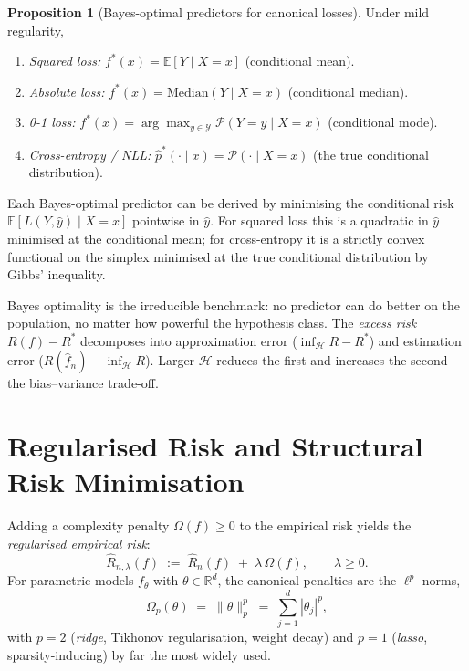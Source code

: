 \documentclass[11pt]{article}
\theoremstyle{definition}
\newtheorem{proposition}[definition]{Proposition}
\begin{document}
\begin{proposition}[Bayes-optimal predictors for canonical losses]
Under mild regularity,
\begin{enumerate}[label=(\roman*), leftmargin=2em]
  \item \emph{Squared loss:}
        $f^{\ast}(x) = \mathbb{E}[Y \mid X = x]$ (conditional mean).
  \item \emph{Absolute loss:}
        $f^{\ast}(x) = \mathrm{Median}(Y \mid X = x)$ (conditional median).
  \item \emph{0-1 loss:}
        $f^{\ast}(x) = \arg\max_{y \in \mathcal{Y}}
                       \mathcal{P}(Y = y \mid X = x)$ (conditional mode).
  \item \emph{Cross-entropy / NLL:}
        $\hat p^{\ast}(\cdot \mid x) = \mathcal{P}(\cdot \mid X = x)$
        (the true conditional distribution).
\end{enumerate}
\end{proposition}

\begin{mathnote}
Each Bayes-optimal predictor can be derived by minimising the conditional
risk $\mathbb{E}[L(Y, \hat y) \mid X = x]$ pointwise in $\hat y$. For
squared loss this is a quadratic in $\hat y$ minimised at the conditional
mean; for cross-entropy it is a strictly convex functional on the simplex
minimised at the true conditional distribution by Gibbs' inequality.
\end{mathnote}

\begin{mlnote}
Bayes optimality is the irreducible benchmark: no predictor can do better
on the population, no matter how powerful the hypothesis class. The
\emph{excess risk} $R(f) - R^{\ast}$ decomposes into approximation error
($\inf_{\mathcal{H}} R - R^{\ast}$) and estimation error
($R(\widehat{f}_n) - \inf_{\mathcal{H}} R$). Larger $\mathcal{H}$ reduces
the first and increases the second -- the bias--variance trade-off.
\end{mlnote}

\section{Regularised Risk and Structural Risk Minimisation}

Adding a complexity penalty $\Omega(f) \geq 0$ to the empirical risk yields
the \emph{regularised empirical risk}:
\[
  \widehat{R}_{n, \lambda}(f) \;:=\; \widehat{R}_n(f) \;+\; \lambda\, \Omega(f),
  \qquad \lambda \geq 0.
\]
For parametric models $f_\theta$ with $\theta \in \mathbb{R}^{d}$, the
canonical penalties are the $\ell^{p}$ norms,
\[
  \Omega_p(\theta) \;=\; \|\theta\|_p^{p}
  \;=\; \sum_{j=1}^{d} |\theta_j|^{p},
\]
with $p = 2$ (\emph{ridge}, Tikhonov regularisation, weight decay) and
$p = 1$ (\emph{lasso}, sparsity-inducing) by far the most widely used.
\end{document}
